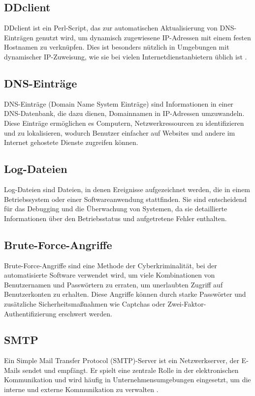 \subsection{DDclient}
\label{subsec:ddclient}
DDclient ist ein Perl-Script, das zur automatischen Aktualisierung von DNS-Einträgen genutzt wird, um dynamisch zugewiesene IP-Adressen mit einem festen Hostnamen zu verknüpfen. Dies ist besonders nützlich in Umgebungen mit dynamischer IP-Zuweisung, wie sie bei vielen Internetdienstanbietern üblich ist \cite{Ddclient} \cite{Raspberry}.

\subsection{DNS-Einträge}
\label{subsec:dnsentries}
DNS-Einträge (Domain Name System Einträge) sind Informationen in einer DNS-Datenbank, die dazu dienen, Domainnamen in IP-Adressen umzuwandeln. Diese Einträge ermöglichen es Computern, Netzwerkressourcen zu identifizieren und zu lokalisieren, wodurch Benutzer einfacher auf Websites und andere im Internet gehostete Dienste zugreifen können.

\subsection{Log-Dateien}
\label{subsec:logfiles}
Log-Dateien sind Dateien, in denen Ereignisse aufgezeichnet werden, die in einem Betriebssystem oder einer Softwareanwendung stattfinden. Sie sind entscheidend für das Debugging und die Überwachung von Systemen, da sie detaillierte Informationen über den Betriebsstatus und aufgetretene Fehler enthalten.

\subsection{Brute-Force-Angriffe}
\label{subsec:bruteforce}
Brute-Force-Angriffe sind eine Methode der Cyberkriminalität, bei der automatisierte Software verwendet wird, um viele Kombinationen von Benutzernamen und Passwörtern zu erraten, um unerlaubten Zugriff auf Benutzerkonten zu erhalten. Diese Angriffe können durch starke Passwörter und zusätzliche Sicherheitsmaßnahmen wie Captchas oder Zwei-Faktor-Authentifizierung erschwert werden.

\subsection{SMTP}
\label{subsec:smtp}
Ein Simple Mail Transfer Protocol (SMTP)-Server ist ein Netzwerkserver, der E-Mails sendet und empfängt. Er spielt eine zentrale Rolle in der elektronischen Kommunikation und wird häufig in Unternehmensumgebungen eingesetzt, um die interne und externe Kommunikation zu verwalten \cite{Smtp}.

